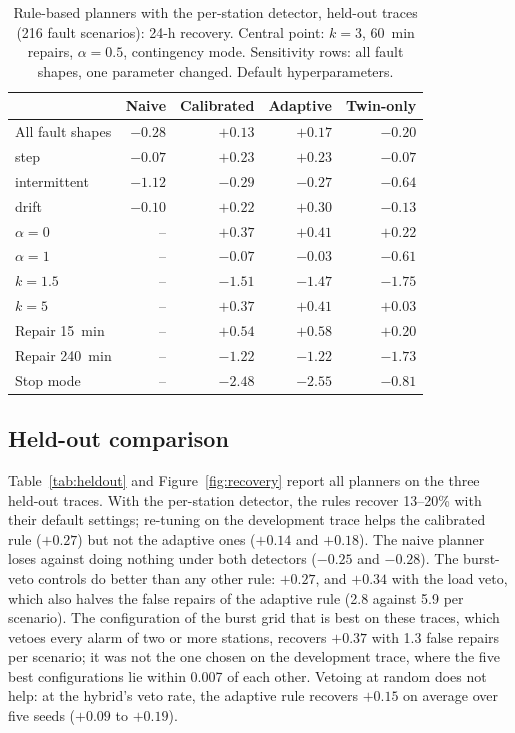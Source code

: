 \documentclass[preprint,11pt]{elsarticle}
\begin{document}
\begin{table}[t]
\centering
\caption{Rule-based planners with the per-station detector, held-out traces (216 fault scenarios): 24-h recovery. Central point: $k=3$, 60~min repairs, $\alpha=0.5$, contingency mode. Sensitivity rows: all fault shapes, one parameter changed. Default hyperparameters.}
\label{tab:sweep}
\small
\begin{tabular}{lrrrr}
\toprule
 & Naive & Calibrated & Adaptive & Twin-only \\
\midrule
All fault shapes & $-0.28$ & $+0.13$ & $+0.17$ & $-0.20$ \\
\quad step & $-0.07$ & $+0.23$ & $+0.23$ & $-0.07$ \\
\quad intermittent & $-1.12$ & $-0.29$ & $-0.27$ & $-0.64$ \\
\quad drift & $-0.10$ & $+0.22$ & $+0.30$ & $-0.13$ \\
\midrule
$\alpha = 0$ & -- & $+0.37$ & $+0.41$ & $+0.22$ \\
$\alpha = 1$ & -- & $-0.07$ & $-0.03$ & $-0.61$ \\
$k = 1.5$ & -- & $-1.51$ & $-1.47$ & $-1.75$ \\
$k = 5$ & -- & $+0.37$ & $+0.41$ & $+0.03$ \\
Repair 15~min & -- & $+0.54$ & $+0.58$ & $+0.20$ \\
Repair 240~min & -- & $-1.22$ & $-1.22$ & $-1.73$ \\
Stop mode & -- & $-2.48$ & $-2.55$ & $-0.81$ \\
\bottomrule
\end{tabular}
\end{table}

\subsection{Held-out comparison}
Table~\ref{tab:heldout} and Figure~\ref{fig:recovery} report all planners on the three held-out traces. With the per-station detector, the rules recover 13--20\% with their default settings; re-tuning on the development trace helps the calibrated rule ($+0.27$) but not the adaptive ones ($+0.14$ and $+0.18$). The naive planner loses against doing nothing under both detectors ($-0.25$ and $-0.28$). The burst-veto controls do better than any other rule: $+0.27$, and $+0.34$ with the load veto, which also halves the false repairs of the adaptive rule (2.8 against 5.9 per scenario). The configuration of the burst grid that is best on these traces, which vetoes every alarm of two or more stations, recovers $+0.37$ with 1.3 false repairs per scenario; it was not the one chosen on the development trace, where the five best configurations lie within 0.007 of each other. Vetoing at random does not help: at the hybrid's veto rate, the adaptive rule recovers $+0.15$ on average over five seeds ($+0.09$ to $+0.19$).
\end{document}
